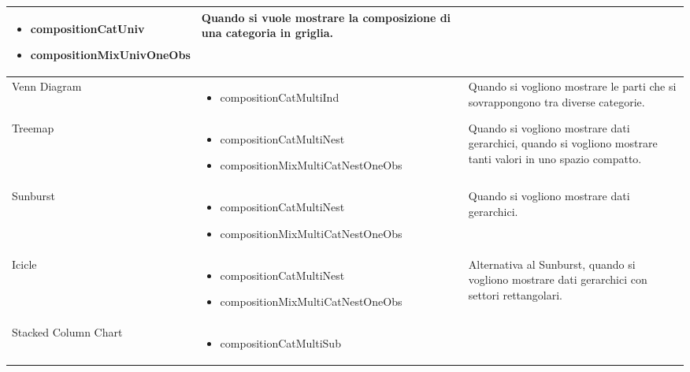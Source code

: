 \begin{xltabular}{\columnwidth}{|p{0.15\columnwidth}|X|p{0.27\columnwidth}|}
\begin{itemize}[noitemsep,topsep=0pt, left=0pt]
        \item compositionCatUniv
        \item compositionMixUnivOneObs
    \end{itemize} & 
    Quando si vuole mostrare la composizione di una categoria in griglia. \\
    \hline
    Venn Diagram & 
    \vspace{-3.5mm}
    \begin{itemize}[noitemsep,topsep=0pt, left=0pt]
        \item compositionCatMultiInd
    \end{itemize} & 
    Quando si vogliono mostrare le parti che si sovrappongono tra diverse categorie. \\
    \hline
    Treemap & 
    \vspace{-3.5mm}
    \begin{itemize}[noitemsep,topsep=0pt, left=0pt]
        \item compositionCatMultiNest
        \item compositionMixMultiCatNestOneObs
    \end{itemize} & 
    Quando si vogliono mostrare dati gerarchici, quando si vogliono mostrare tanti valori in uno spazio compatto. \\
    \hline
    Sunburst & 
    \vspace{-3.5mm}
    \begin{itemize}[noitemsep,topsep=0pt, left=0pt]
        \item compositionCatMultiNest
        \item compositionMixMultiCatNestOneObs
    \end{itemize} & 
    Quando si vogliono mostrare dati gerarchici. \\
    \hline
    Icicle & 
    \vspace{-3.5mm}
    \begin{itemize}[noitemsep,topsep=0pt, left=0pt]
        \item compositionCatMultiNest
        \item compositionMixMultiCatNestOneObs
    \end{itemize} & 
    Alternativa al Sunburst, quando si vogliono mostrare dati gerarchici con settori rettangolari. \\
    \hline
    Stacked Column Chart & 
    \vspace{-3.5mm}
    \begin{itemize}[noitemsep,topsep=0pt, left=0pt]
        \item compositionCatMultiSub

\end{itemize}
\end{xltabular}
